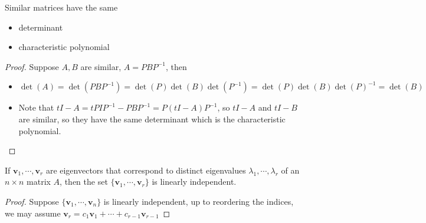 \documentclass{beamer}
\theoremstyle{definition}
\theoremstyle{remark}
\begin{document}
\begin{frame}[t]
\begin{theorem}\label{10:10-07/07/2022}
Similar matrices have the same
\begin{itemize}
\item determinant
\item characteristic polynomial
\end{itemize}
\end{theorem}
\pause
\begin{proof}
Suppose $A,B$ are similar, $A=PBP^{-1}$, then
\begin{itemize}
\item $\det(A)=\det(PBP^{-1})=\det(P)\det(B)\det(P^{-1})=\det(P)\det(B)\det(P)^{-1}=\det(B)$
\item Note that $tI-A=tPIP^{-1}-PBP^{-1}=P(tI-A)P^{-1}$, so $tI-A$ and $tI-B$ are similar, so they have the same determinant which is the characteristic polynomial.
\end{itemize}
\end{proof}
\end{frame}
\begin{frame}[t]
\begin{theorem}\label{17:43-07/06/2022}
If $\mathbf v_1,\cdots,\mathbf v_r$ are eigenvectors that correspond to distinct eigenvalues $\lambda_1,\cdots,\lambda_r$ of an $n\times n$ matrix $A$, then the set $\{\mathbf v_1,\cdots,\mathbf v_r\}$ is linearly independent. 
\end{theorem}
\pause
\begin{proof}
Suppose $\{\mathbf v_1,\cdots,\mathbf v_n\}$ is linearly independent, up to reordering the indices, we may assume $\mathbf v_r=c_1\mathbf v_1+\cdots+c_{r-1}\mathbf v_{r-1}$
\end{proof}
\end{frame}
\end{document}
